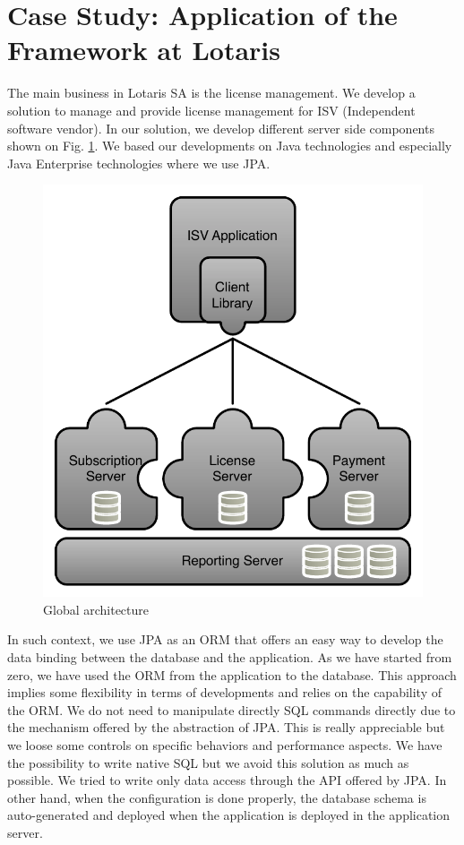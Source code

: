 \section{Case Study: Application of the Framework at Lotaris}

The main business in Lotaris SA is the license management. We develop a solution to manage and provide license management for ISV (Independent software vendor). In our solution, we develop different server side components shown on Fig. \ref{fig:globArchi}. We based our developments on Java technologies and especially Java Enterprise technologies where we use JPA\cite{jpa}.

\begin{figure}[h]
        \centering
        \includegraphics[scale=0.5]{images/archi-glob.pdf}
        \caption{Global architecture}
        \label{fig:globArchi}
\end{figure}

In such context, we use JPA as an ORM that offers an easy way to develop the data binding between the database and the application. As we have started from zero, we have used the ORM from the application to the database. This approach implies some flexibility in terms of developments and relies on the capability of the ORM. We do not need to manipulate directly SQL commands directly due to the mechanism offered by the abstraction of JPA. This is really appreciable but we loose some controls on specific behaviors and performance aspects. We have the possibility to write native SQL but we avoid this solution as much as possible. We tried to write only data access through the API offered by JPA. In other hand, when the configuration is done properly, the database schema is auto-generated and deployed when the application is deployed in the application server. 


